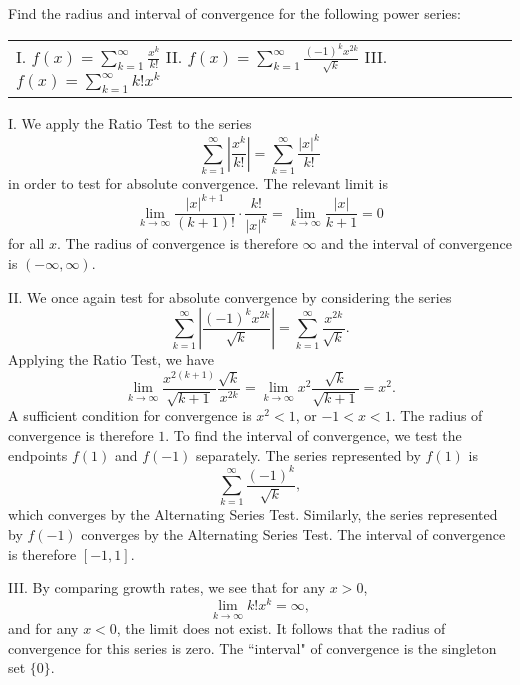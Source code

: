 \documentclass[]{ximera}
\begin{document}
\begin{problem} 
Find the radius and interval of convergence for the following power series:

\begin{tabular}{lll}
I.  $f(x) = \sum_{k=1}^{\infty} \frac{x^k}{k!}$ \qquad  \qquad II. $f(x) = \sum_{k=1}^{\infty} \frac{(-1)^kx^{2k}}{\sqrt{k}}$  \qquad  \qquad III. $f(x) = \sum_{k=1}^{\infty} k! x^k$
\end{tabular}

\begin{solution}
I. We apply the Ratio Test to the series 
$$
\sum_{k=1}^{\infty} \left|\frac{x^k}{k!}\right| = \sum_{k=1}^{\infty} \frac{|x|^k}{k!}
$$
in order to test for absolute convergence. The relevant limit is 
$$
\lim_{k \rightarrow \infty} \frac{|x|^{k+1}}{(k+1)!} \cdot \frac{k!}{|x|^k} = \lim_{k \rightarrow \infty} \frac{|x|}{k+1} = 0
$$
for all $x$. The radius of convergence is therefore $\infty$ and the interval of convergence is $(-\infty,\infty)$.

II. We once again test for absolute convergence by considering the series 
$$
\sum_{k=1}^{\infty} \left|\frac{(-1)^kx^{2k}}{\sqrt{k}}\right| = \sum_{k=1}^{\infty} \frac{x^{2k}}{\sqrt{k}}.
$$
Applying the Ratio Test, we have
$$
\lim_{k\rightarrow \infty} \frac{x^{2(k+1)}}{\sqrt{k+1}} \frac{\sqrt{k}}{x^{2k}} = \lim_{k\rightarrow \infty} x^2 \frac{\sqrt{k}}{\sqrt{k+1}} = x^2.
$$
A sufficient condition for convergence is $x^2 < 1$, or $-1 < x < 1$. The radius of convergence is therefore $1$. To find the interval of convergence, we test the endpoints $f(1)$ and $f(-1)$ separately. The series represented by $f(1)$ is 
$$
\sum_{k=1}^{\infty} \frac{(-1)^k}{\sqrt{k}},
$$
which converges by the Alternating Series Test. Similarly, the series represented by $f(-1)$ converges by the Alternating Series Test. The interval of convergence is therefore $[-1,1]$. 

III. By comparing growth rates, we see that for any $x > 0$, 
$$
\lim_{k\rightarrow \infty} k! x^k  = \infty,
$$
and for any $x < 0$, the limit does not exist. It follows that the radius of convergence for this series is zero. The ``interval" of convergence is the singleton set $\{0\}$. 
\end{solution}
\end{problem}
\end{document}
